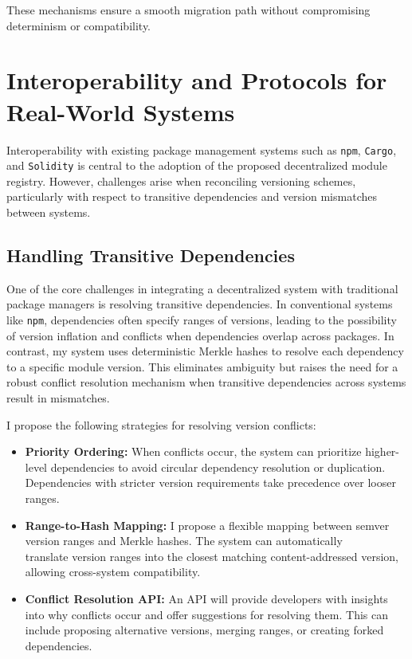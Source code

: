 \documentclass[sigplan,screen]{acmart}
\begin{document}
These mechanisms ensure a smooth migration path without compromising determinism or compatibility.

\section{Interoperability and Protocols for Real-World Systems}
\label{sec:interoperability-real-world}

Interoperability with existing package management systems such as \texttt{npm}, \texttt{Cargo}, and \texttt{Solidity} is central to the adoption of the proposed decentralized module registry. However, challenges arise when reconciling versioning schemes, particularly with respect to transitive dependencies and version mismatches between systems.

\subsection{Handling Transitive Dependencies}
One of the core challenges in integrating a decentralized system with traditional package managers is resolving transitive dependencies. In conventional systems like \texttt{npm}, dependencies often specify ranges of versions, leading to the possibility of version inflation and conflicts when dependencies overlap across packages. In contrast, my system uses deterministic Merkle hashes to resolve each dependency to a specific module version. This eliminates ambiguity but raises the need for a robust conflict resolution mechanism when transitive dependencies across systems result in mismatches.

I propose the following strategies for resolving version conflicts:

\begin{itemize}
	\item \textbf{Priority Ordering:} When conflicts occur, the system can prioritize higher-level dependencies to avoid circular dependency resolution or duplication. Dependencies with stricter version requirements take precedence over looser ranges.
	\item \textbf{Range-to-Hash Mapping:} I propose a flexible mapping between semver version ranges and Mer\-kle hashes. The system can automatically \\translate version ranges into the closest matching content-addressed version, allowing cross-system compatibility.
	\item \textbf{Conflict Resolution API:} An API will provide developers with insights into why conflicts occur and offer suggestions for resolving them. This can include proposing alternative versions, merging ranges, or creating forked dependencies.
\end{itemize}
\end{document}
